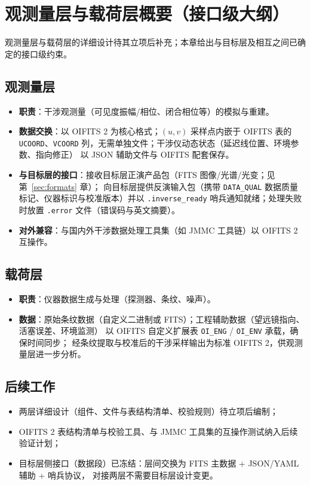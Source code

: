 \section{观测量层与载荷层概要（接口级大纲）}
\label{sec:layers}

观测量层与载荷层的详细设计待其立项后补充；本章给出与目标层及相互之间已确定的接口级约束。

\subsection{观测量层}

\begin{itemize}
  \item \textbf{职责}：干涉观测量（可见度振幅/相位、闭合相位等）的模拟与重建。
  \item \textbf{数据交换}：以 OIFITS 2 \cite{duvert2017oifits} 为核心格式；$(u,v)$ 采样点内嵌于 OIFITS 表的
        \texttt{UCOORD}、\texttt{VCOORD} 列，无需单独文件；干涉仪动态状态（延迟线位置、环境参数、指向修正）
        以 JSON 辅助文件与 OIFITS 配套保存。
  \item \textbf{与目标层的接口}：接收目标层正演产品包（FITS 图像/光谱/光变；见第~\ref{sec:formats} 章）；
        向目标层提供反演输入包（携带 \texttt{DATA\_QUAL} 数据质量标记、仪器标识与校准版本）并以
        \texttt{.inverse\_ready} 哨兵通知就绪；处理失败时放置 \texttt{.error} 文件（错误码与英文摘要）。
  \item \textbf{对外兼容}：与国内外干涉数据处理工具集（如 JMMC 工具链）以 OIFITS 2 互操作。
\end{itemize}

\subsection{载荷层}

\begin{itemize}
  \item \textbf{职责}：仪器数据生成与处理（探测器、条纹、噪声）。
  \item \textbf{数据}：原始条纹数据（自定义二进制或 FITS）；工程辅助数据（望远镜指向、活塞误差、环境监测）
        以 OIFITS 自定义扩展表 \texttt{OI\_ENG} / \texttt{OI\_ENV} 承载，确保时间同步；
        经条纹提取与校准后的干涉采样输出为标准 OIFITS 2，供观测量层进一步分析。
\end{itemize}

\subsection{后续工作}

\begin{itemize}
  \item 两层详细设计（组件、文件与表结构清单、校验规则）待立项后编制；
  \item OIFITS 2 表结构清单与校验工具、与 JMMC 工具集的互操作测试纳入后续验证计划；
  \item 目标层侧接口（数据段）已冻结：层间交换为 FITS 主数据 + JSON/YAML 辅助 + 哨兵协议，
        对接两层不需要目标层设计变更。
\end{itemize}
